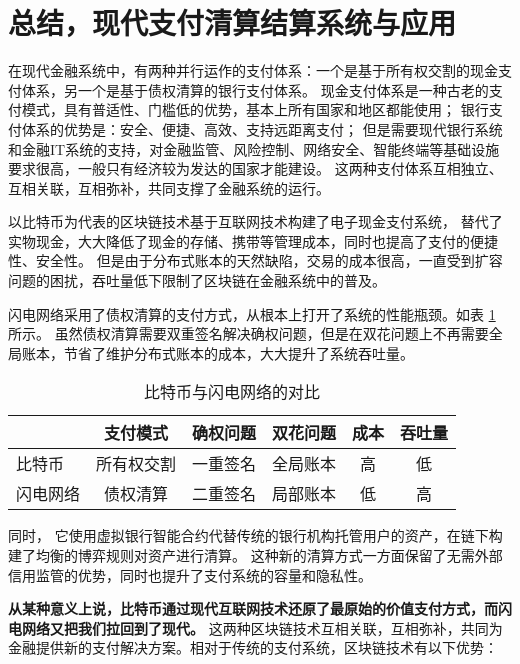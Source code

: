 \section{总结，现代支付清算结算系统与应用}

在现代金融系统中，有两种并行运作的支付体系：一个是基于所有权交割的现金支付体系，另一个是基于债权清算的银行支付体系。
现金支付体系是一种古老的支付模式，具有普适性、门槛低的优势，基本上所有国家和地区都能使用；
银行支付体系的优势是：安全、便捷、高效、支持远距离支付；
但是需要现代银行系统和金融IT系统的支持，对金融监管、风险控制、网络安全、智能终端等基础设施要求很高，一般只有经济较为发达的国家才能建设。
这两种支付体系互相独立、互相关联，互相弥补，共同支撑了金融系统的运行。

以比特币为代表的区块链技术基于互联网技术构建了电子现金支付系统，
替代了实物现金，大大降低了现金的存储、携带等管理成本，同时也提高了支付的便捷性、安全性。
但是由于分布式账本的天然缺陷，交易的成本很高，一直受到扩容问题的困扰，吞吐量低下限制了区块链在金融系统中的普及。

闪电网络采用了债权清算的支付方式，从根本上打开了系统的性能瓶颈。如表 \ref{table:btc_lightning} 所示。
虽然债权清算需要双重签名解决确权问题，但是在双花问题上不再需要全局账本，节省了维护分布式账本的成本，大大提升了系统吞吐量。

\begin{table}[h!]
\centering
    \begin{tabular}{| l | c | c | c | c | c |}
      \hline
      & 支付模式 & 确权问题 & 双花问题 & 成本 & 吞吐量 \\
      \hline
      比特币 & 所有权交割 & 一重签名 & 全局账本 & 高 & 低 \\
      \hline
      闪电网络 & 债权清算 & 二重签名 & 局部账本 & 低 & 高 \\
      \hline
    \end{tabular}
\caption{比特币与闪电网络的对比}
\label{table:btc_lightning}
\end{table}

同时，
它使用虚拟银行智能合约代替传统的银行机构托管用户的资产，在链下构建了均衡的博弈规则对资产进行清算。
这种新的清算方式一方面保留了无需外部信用监管的优势，同时也提升了支付系统的容量和隐私性。

\textbf{从某种意义上说，比特币通过现代互联网技术还原了最原始的价值支付方式，而闪电网络又把我们拉回到了现代。}
这两种区块链技术互相关联，互相弥补，共同为金融提供新的支付解决方案。相对于传统的支付系统，区块链技术有以下优势：

